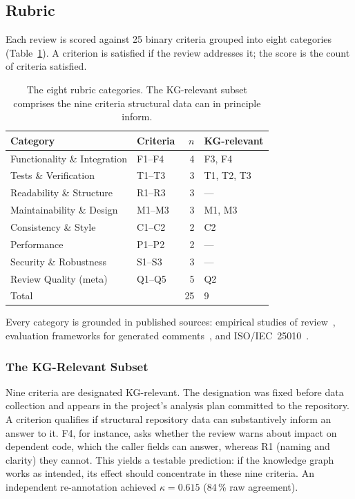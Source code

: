 \subsection{Rubric}
\label{sec:rubric}

Each review is scored against 25 binary criteria grouped into eight categories
(Table~\ref{tab:rubric-categories}). A criterion is satisfied if the review
addresses it; the score is the count of criteria satisfied.

\begin{table}[htbp]
    \centering
    \caption{The eight rubric categories. The KG-relevant subset comprises the
             nine criteria structural data can in principle inform.}
    \label{tab:rubric-categories}
    \begin{tabular}{llrl}
        \toprule
        Category & Criteria & $n$ & KG-relevant \\
        \midrule
        Functionality \& Integration & F1--F4 & 4 & F3, F4 \\
        Tests \& Verification        & T1--T3 & 3 & T1, T2, T3 \\
        Readability \& Structure     & R1--R3 & 3 & --- \\
        Maintainability \& Design    & M1--M3 & 3 & M1, M3 \\
        Consistency \& Style         & C1--C2 & 2 & C2 \\
        Performance                  & P1--P2 & 2 & --- \\
        Security \& Robustness       & S1--S3 & 3 & --- \\
        Review Quality (meta)        & Q1--Q5 & 5 & Q2 \\
        \midrule
        Total                        &        & 25 & 9 \\
        \bottomrule
    \end{tabular}
\end{table}

Every category is grounded in published sources: empirical studies of
review~\cite{bacchelli2013,bosu2015,sadowski2018}, evaluation frameworks for
generated comments~\cite{li2022codereviewer,hong2024deepcrceval}, and
ISO/IEC~25010~\cite{iso25010}.

\subsubsection{The KG-Relevant Subset}

Nine criteria are designated KG-relevant. The designation was fixed before
data collection and appears in the project's analysis plan committed to the
repository. A criterion qualifies if structural repository data can
substantively inform an answer to it. F4, for instance, asks whether the
review warns about impact on dependent code, which the caller fields can
answer, whereas R1 (naming and clarity) they cannot. This yields a testable
prediction: if the knowledge graph works as intended, its effect should
concentrate in these nine criteria. An independent re-annotation achieved
$\kappa = 0.615$ (84\,\% raw agreement).

